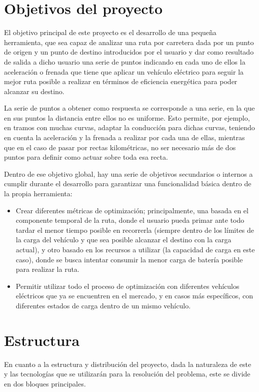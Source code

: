\documentclass[11pt,spanish,listoffigures,listoftables]{tfgetsinf}
\begin{document}
\section{Objetivos del proyecto}
El objetivo principal de este proyecto es el desarrollo de una pequeña herramienta, que sea capaz de analizar una ruta por carretera dada por un punto de origen y un punto de destino introducidos por el usuario y dar como resultado de salida a dicho usuario una serie de puntos indicando en cada uno de ellos la aceleración o frenada que tiene que aplicar un vehículo eléctrico para seguir la mejor ruta posible a realizar en términos de eficiencia energética para poder alcanzar su destino.

La serie de puntos a obtener como respuesta se corresponde a una serie, en la que en sus puntos la distancia entre ellos no es uniforme. Esto permite, por ejemplo, en tramos con muchas curvas, adaptar la conducción para dichas curvas, teniendo en cuenta la aceleración y la frenada a realizar por cada una de ellas, mientras que en el caso de pasar por rectas kilométricas, no ser necesario más de dos puntos para definir como actuar sobre toda esa recta.

Dentro de ese objetivo global, hay una serie de objetivos secundarios o internos a cumplir durante el desarrollo para garantizar una funcionalidad básica dentro de la propia herramienta:
\begin{itemize}
    \item Crear diferentes métricas de optimización; principalmente, una basada en el componente temporal de la ruta, donde el usuario pueda primar ante todo tardar el menor tiempo posible en recorrerla (siempre dentro de los límites de la carga del vehículo y que sea posible alcanzar el destino con la carga actual), y otro basado en los recursos a utilizar (la capacidad de carga en este caso), donde se busca intentar consumir la menor carga de batería posible para realizar la ruta.
    \item Permitir utilizar todo el proceso de optimización con diferentes vehículos eléctricos que ya se encuentren en el mercado, y en casos más específicos, con diferentes estados de carga dentro de un mismo vehículo.
\end{itemize}
 
\section{Estructura}
En cuanto a la estructura y distribución del proyecto, dada la naturaleza de este y las tecnologías que se utilizarán para la resolución del problema, este se divide en dos bloques principales.
\end{document}
